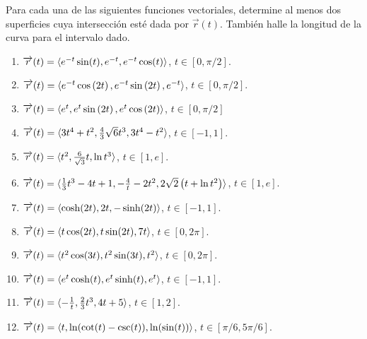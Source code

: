 \begin{ejer}
\normalfont
Para cada una de las siguientes funciones vectoriales, determine al menos dos
superficies cuya intersección esté dada por $\overrightarrow{r}(t)$.
También halle la longitud de la curva para el intervalo dado.
\begin{enumerate}
\item $ \overrightarrow{r}(t)=\langle e^{-t}\sin (t),e^{-t},e^{-t}\cos (t) \rangle$, $t \in [0,\pi/2]$.
\item $ \overrightarrow{r}(t)=\langle e^{-t}\cos \left( 2t\right),e^{-t}\sin \left( 2t\right),e^{-t} \rangle $,
$t \in [0,\pi/2]$.
\item $\overrightarrow{r}(t)=\langle e^{t},e^{t}\sin \left(2t\right) ,e^{t}\cos \left( 2t\right) \rangle $,
$t \in [0,\pi/2]$
\item $ \overrightarrow{r}(t)=\langle 3t^{4}+t^{2},\frac{4}{3}\sqrt{6}t^{3},3t^{4}-t^{2}\rangle $,
$t \in [-1,1]$.
\item $ \overrightarrow{r}(t)=\langle t^{2},\frac{6}{\sqrt{3}}t,\ln t^{3}\rangle $,
$t \in [1,e]$.
\item $\overrightarrow{r}(t) =\langle \frac{1}{3}t^{3}-4t+1,-\frac{4}{t}-2t^{2},2\sqrt{2}\left( t+\ln t^{2}\right) \rangle $,
$t \in [1,e]$.
\normalfont
\item $\overrightarrow{r}(t) =\langle \cosh(2t), 2t, -\sinh(2t) \rangle $, $t\in [-1,1]$.
\item $\overrightarrow{r}(t) =\langle t \cos (2t),t \sin (2t),7 t \rangle $, $t\in [0,2\pi]$.
\item $\overrightarrow{r}(t) =\langle t^2\cos (3t),t^2 \sin (3t),t^2 \rangle $, $t\in [0,2\pi]$.
\item $\overrightarrow{r}(t) =\langle e^t \cosh(t),e^t \sinh(t),e^t \rangle $, $t\in [-1,1]$.
\item $\overrightarrow{r}(t) =\langle -\frac{1}{t},\frac{2}{3}t^3,4t+5\rangle $, $t\in [1,2]$.
\item $\overrightarrow{r}(t) =\langle t,\ln (\cot (t)-\csc (t)),\ln(\sin (t)) \rangle $, $t\in [\pi/6,5\pi/6]$.

\end{enumerate}
\end{ejer}

